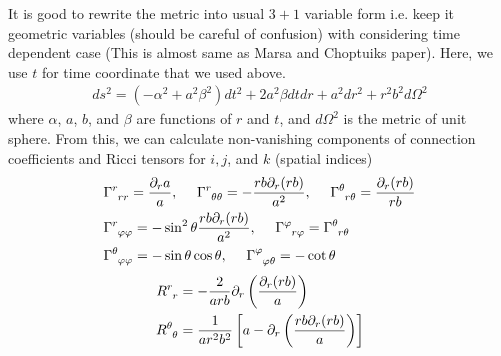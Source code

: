 \documentclass[prd]{revtex4}
\newcommand*\apost{\textsc{\char13}}
\begin{document}
It is good to rewrite the metric into usual $3+1$ variable form i.e. keep it geometric variables (should be careful of confusion) with considering time dependent case (This is almost same as Marsa and Choptuik\apost s paper). Here, we use $t$ for time coordinate that we used above.
\begin{align}
\label{eqn:gen-sph-met}
ds^2 = (-\alpha^2 + a^2 \beta^2) dt^2 + 2a^2 \beta dt dr + a^2 dr^2 + r^2 b^2 d \Omega^2
\end{align}
where $\alpha$, $a$, $b$, and $\beta$ are functions of $r$ and $t$, and $d\Omega^2$ is the metric of unit sphere. From this, we can calculate non-vanishing components of connection coefficients and Ricci tensors for $i,j$, and $k$ (spatial indices)
\begin{align}
&\Gamma\indices{^r_{rr}} = \frac{\partial_r a}{a}, \,\,\,\,\,\,\,\, \Gamma\indices{^r_{\theta \theta}} = - \frac{rb \partial_r (rb)}{a^2}, \,\,\,\,\,\,\,\, \Gamma\indices{^\theta_{r \theta}} = \frac{\partial_r (rb)}{rb} \nonumber  \\
&\Gamma\indices{^r_{\varphi \varphi}} = -\sin^2 \theta \frac{rb \partial_r (rb)}{a^2}, \,\,\,\,\,\,\,\, \Gamma\indices{^\varphi_{r \varphi}} = \Gamma\indices{^\theta_{r \theta}} \nonumber \\
&\Gamma\indices{^\theta_{\varphi \varphi}} = -\sin \theta \cos \theta, \,\,\,\,\,\,\,\, \Gamma\indices{^\varphi_{\varphi \theta}} = -\cot \theta \nonumber 
\end{align}
\begin{align}
R\indices{^r_r} &= -\frac{2}{arb} \partial_r \left(\frac{\partial_r (rb)}{a} \right) \\
R\indices{^\theta_\theta} &= \frac{1}{ar^2b^2} \left[a-\partial_r \left(\frac{rb \partial_r (rb)}{a} \right) \right] \\
\end{align}
\end{document}
